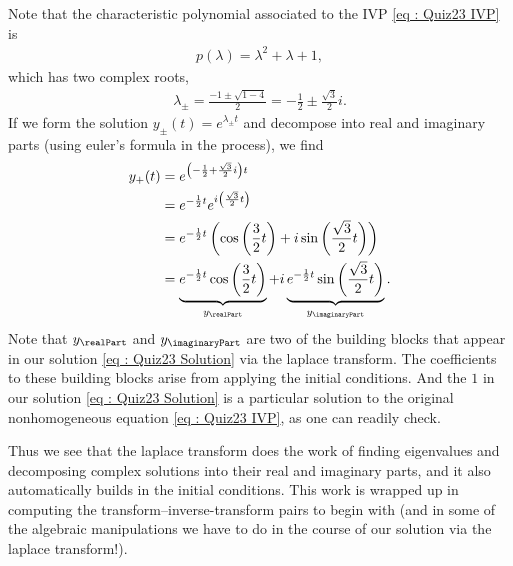 {\begin{remark}
Note that the characteristic polynomial associated to the IVP \eqref{eq : Quiz23 IVP} is
\begin{align*}
p(\lambda)
=
\lambda^{2} + \lambda + 1,
\end{align*}
which has two complex roots,
\begin{align*}
\lambda_{\pm}
=
\frac{-1 \pm{} \sqrt{1 - 4}}{2}
=
-\frac{1}{2} \pm{} \frac{\sqrt{3}}{2} i.
\end{align*}
If we form the solution $y_{\pm}(t) = e^{\lambda_{\pm} t}$ and decompose into real and imaginary parts (using euler's formula in the process), we find
\begin{align*}
y_{+}(t)
&=
e^{\left(-\frac{1}{2} + \frac{\sqrt{3}}{2} i\right) t}
\\
&=
e^{-\frac{1}{2} t} e^{i \left(\frac{\sqrt{3}}{2} t\right)}
\\
&=
e^{-\frac{1}{2} t} \left(\cos\left(\frac{3}{2} t\right) + i \sin\left(\frac{\sqrt{3}}{2} t\right)\right)
\\
&=
\underbrace{e^{-\frac{1}{2} t} \cos\left(\frac{3}{2} t\right)}_{y_{\realPart}} + i \underbrace{e^{-\frac{1}{2} t} \sin\left(\frac{\sqrt{3}}{2} t\right)}_{y_{\imaginaryPart}}.
\end{align*}
Note that $y_{\realPart}$ and $y_{\imaginaryPart}$ are two of the building blocks that appear in our solution \eqref{eq : Quiz23 Solution} via the laplace transform. The coefficients to these building blocks arise from applying the initial conditions. And the $1$ in our solution \eqref{eq : Quiz23 Solution} is a particular solution to the original nonhomogeneous equation \eqref{eq : Quiz23 IVP}, as one can readily check.

Thus we see that the laplace transform does the work of finding eigenvalues and decomposing complex solutions into their real and imaginary parts, and it also automatically builds in the initial conditions. This work is wrapped up in computing the transform--inverse-transform pairs to begin with (and in some of the algebraic manipulations we have to do in the course of our solution via the laplace transform!).
\end{remark}}%